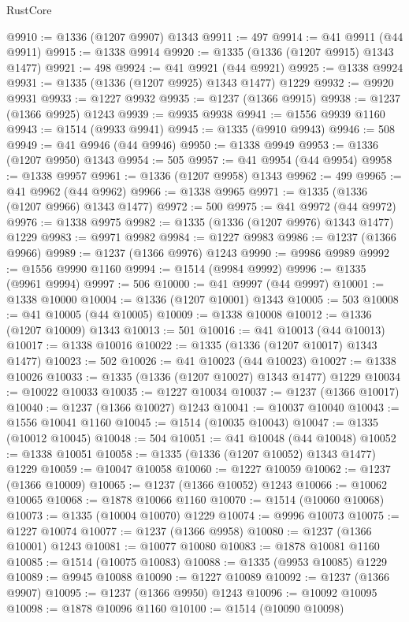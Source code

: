 \begin{lexlean}{RustCore}
\begin{coremodule}
@9910 := @1336 (@1207 @9907) @1343
@9911 := 497
@9914 := @41 @9911 (@44 @9911)
@9915 := @1338 @9914
@9920 := @1335 (@1336 (@1207 @9915) @1343 @1477)
@9921 := 498
@9924 := @41 @9921 (@44 @9921)
@9925 := @1338 @9924
@9931 := @1335 (@1336 (@1207 @9925) @1343 @1477) @1229
@9932 := @9920 @9931
@9933 := @1227 @9932
@9935 := @1237 (@1366 @9915)
@9938 := @1237 (@1366 @9925) @1243
@9939 := @9935 @9938
@9941 := @1556 @9939 @1160
@9943 := @1514 (@9933 @9941)
@9945 := @1335 (@9910 @9943)
@9946 := 508
@9949 := @41 @9946 (@44 @9946)
@9950 := @1338 @9949
@9953 := @1336 (@1207 @9950) @1343
@9954 := 505
@9957 := @41 @9954 (@44 @9954)
@9958 := @1338 @9957
@9961 := @1336 (@1207 @9958) @1343
@9962 := 499
@9965 := @41 @9962 (@44 @9962)
@9966 := @1338 @9965
@9971 := @1335 (@1336 (@1207 @9966) @1343 @1477)
@9972 := 500
@9975 := @41 @9972 (@44 @9972)
@9976 := @1338 @9975
@9982 := @1335 (@1336 (@1207 @9976) @1343 @1477) @1229
@9983 := @9971 @9982
@9984 := @1227 @9983
@9986 := @1237 (@1366 @9966)
@9989 := @1237 (@1366 @9976) @1243
@9990 := @9986 @9989
@9992 := @1556 @9990 @1160
@9994 := @1514 (@9984 @9992)
@9996 := @1335 (@9961 @9994)
@9997 := 506
@10000 := @41 @9997 (@44 @9997)
@10001 := @1338 @10000
@10004 := @1336 (@1207 @10001) @1343
@10005 := 503
@10008 := @41 @10005 (@44 @10005)
@10009 := @1338 @10008
@10012 := @1336 (@1207 @10009) @1343
@10013 := 501
@10016 := @41 @10013 (@44 @10013)
@10017 := @1338 @10016
@10022 := @1335 (@1336 (@1207 @10017) @1343 @1477)
@10023 := 502
@10026 := @41 @10023 (@44 @10023)
@10027 := @1338 @10026
@10033 := @1335 (@1336 (@1207 @10027) @1343 @1477) @1229
@10034 := @10022 @10033
@10035 := @1227 @10034
@10037 := @1237 (@1366 @10017)
@10040 := @1237 (@1366 @10027) @1243
@10041 := @10037 @10040
@10043 := @1556 @10041 @1160
@10045 := @1514 (@10035 @10043)
@10047 := @1335 (@10012 @10045)
@10048 := 504
@10051 := @41 @10048 (@44 @10048)
@10052 := @1338 @10051
@10058 := @1335 (@1336 (@1207 @10052) @1343 @1477) @1229
@10059 := @10047 @10058
@10060 := @1227 @10059
@10062 := @1237 (@1366 @10009)
@10065 := @1237 (@1366 @10052) @1243
@10066 := @10062 @10065
@10068 := @1878 @10066 @1160
@10070 := @1514 (@10060 @10068)
@10073 := @1335 (@10004 @10070) @1229
@10074 := @9996 @10073
@10075 := @1227 @10074
@10077 := @1237 (@1366 @9958)
@10080 := @1237 (@1366 @10001) @1243
@10081 := @10077 @10080
@10083 := @1878 @10081 @1160
@10085 := @1514 (@10075 @10083)
@10088 := @1335 (@9953 @10085) @1229
@10089 := @9945 @10088
@10090 := @1227 @10089
@10092 := @1237 (@1366 @9907)
@10095 := @1237 (@1366 @9950) @1243
@10096 := @10092 @10095
@10098 := @1878 @10096 @1160
@10100 := @1514 (@10090 @10098)

\end{coremodule}
\end{lexlean}
